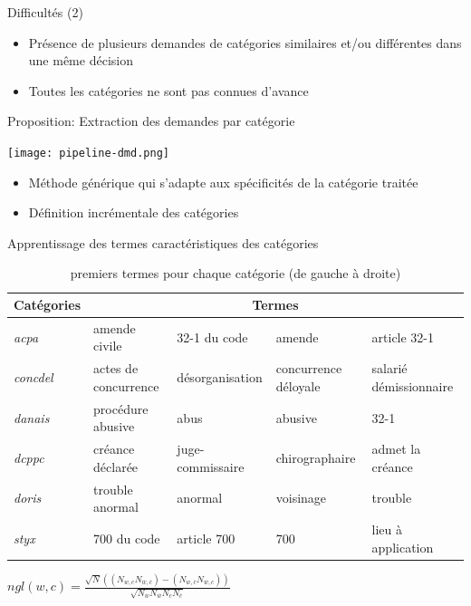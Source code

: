 \documentclass[newPxFont,pagenumber]{beamer}
\begin{document}
\begin{frame}{Difficultés (2)}
\begin{alertblock}{}
\begin{itemize}
\item Présence de plusieurs demandes de catégories similaires et/ou différentes dans une m\^eme décision
\item Toutes les catégories ne sont pas connues d'avance
\end{itemize}
\end{alertblock}
\end{frame}

\begin{frame}{Proposition: Extraction des demandes par catégorie}


\centering \texttt{[image: pipeline-dmd.png]}

{\scriptsize
\begin{itemize}
\item Méthode générique qui s'adapte aux spécificités de la catégorie traitée
\item Définition incrémentale des catégories
\end{itemize}
}
\end{frame}


\begin{frame}{Apprentissage des termes caractéristiques des catégories}
\begin{table}[!htb]
\begin{center} \scriptsize
\begin{tabular}{|l||p{}|p{}|p{}|p{}|}
\hline
Catégories & \multicolumn{4}{c|}{Termes} \\ \hline
\textit{acpa} & amende civile & 32-1 du code & amende & article 32-1 \\ \hline 
 \textit{concdel} & actes de concurrence & désorganisation & concurrence déloyale & salarié démissionnaire   \\ \hline
 \textit{danais} & procédure abusive & abus & abusive & 32-1   \\ \hline
 \textit{dcppc} & créance déclarée & juge-commissaire & 
chirographaire & admet la créance  \\ \hline
  \textit{doris} & trouble anormal & anormal & voisinage & trouble  \\ \hline
 \textit{styx} & 700 du code & article 700 & 700 & lieu à application  \\ \hline

\end{tabular}
\end{center}
\caption{premiers termes pour chaque catégorie (de gauche à droite)}\label{termes-select}
\end{table}
$ngl(w,c) = \frac{\sqrt{N} ((N_{w,c} N_{\overline{w},\overline{c}}) - (N_{w,\overline{c}} N_{\overline{w},c}))}{\sqrt{N_w N_{\overline{w}} N_c N_{\overline{c}}}}$ \cite{ng1997ngl}
\end{frame}
\end{document}
